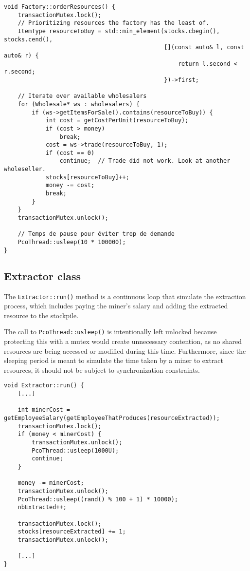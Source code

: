 \documentclass{article}
\begin{document}
    \begin{lstlisting}
void Factory::orderResources() {
    transactionMutex.lock();
    // Prioritizing resources the factory has the least of.
    ItemType resourceToBuy = std::min_element(stocks.cbegin(), stocks.cend(),
                                              [](const auto& l, const auto& r) {
                                                  return l.second < r.second;
                                              })->first;

    // Iterate over available wholesalers
    for (Wholesale* ws : wholesalers) {
        if (ws->getItemsForSale().contains(resourceToBuy)) {
            int cost = getCostPerUnit(resourceToBuy);
            if (cost > money)
                break;
            cost = ws->trade(resourceToBuy, 1);
            if (cost == 0)
                continue;  // Trade did not work. Look at another wholeseller.
            stocks[resourceToBuy]++;
            money -= cost;
            break;
        }
    }
    transactionMutex.unlock();

    // Temps de pause pour éviter trop de demande
    PcoThread::usleep(10 * 100000);
}
    \end{lstlisting}

    \subsection{Extractor class}

    The \texttt{Extractor::run()} method is a continuous loop that simulate the extraction process, which includes paying the miner's salary and adding the extracted resource to the stockpile.

    The call to \texttt{PcoThread::usleep()} is intentionally left unlocked because protecting this with a mutex would create unnecessary
    contention, as no shared resources are being accessed or modified during this time. Furthermore, since the sleeping period is
    meant to simulate the time taken by a miner to extract resources, it should not be subject to synchronization constraints.

    \begin{lstlisting}
void Extractor::run() {
    [...]

    int minerCost = getEmployeeSalary(getEmployeeThatProduces(resourceExtracted));
    transactionMutex.lock();
    if (money < minerCost) {
        transactionMutex.unlock();
        PcoThread::usleep(1000U);
        continue;
    }

    money -= minerCost;
    transactionMutex.unlock();
    PcoThread::usleep((rand() % 100 + 1) * 10000);
    nbExtracted++;

    transactionMutex.lock();
    stocks[resourceExtracted] += 1;
    transactionMutex.unlock();

    [...]
}
    \end{lstlisting}
\end{document}

